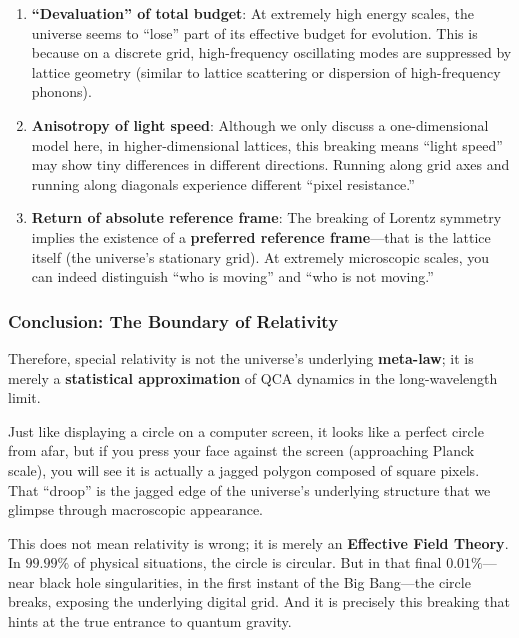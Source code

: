 \begin{enumerate}
\item \textbf{``Devaluation'' of total budget}: At extremely high energy scales, the universe seems to ``lose'' part of its effective budget for evolution. This is because on a discrete grid, high-frequency oscillating modes are suppressed by lattice geometry (similar to lattice scattering or dispersion of high-frequency phonons).

\item \textbf{Anisotropy of light speed}: Although we only discuss a one-dimensional model here, in higher-dimensional lattices, this breaking means ``light speed'' may show tiny differences in different directions. Running along grid axes and running along diagonals experience different ``pixel resistance.''

\item \textbf{Return of absolute reference frame}: The breaking of Lorentz symmetry implies the existence of a \textbf{preferred reference frame}---that is the lattice itself (the universe's stationary grid). At extremely microscopic scales, you can indeed distinguish ``who is moving'' and ``who is not moving.''
\end{enumerate}

\subsubsection{Conclusion: The Boundary of Relativity}

Therefore, special relativity is not the universe's underlying \textbf{meta-law}; it is merely a \textbf{statistical approximation} of QCA dynamics in the long-wavelength limit.

Just like displaying a circle on a computer screen, it looks like a perfect circle from afar, but if you press your face against the screen (approaching Planck scale), you will see it is actually a jagged polygon composed of square pixels. That ``droop'' is the jagged edge of the universe's underlying structure that we glimpse through macroscopic appearance.

This does not mean relativity is wrong; it is merely an \textbf{Effective Field Theory}. In $99.99\%$ of physical situations, the circle is circular. But in that final $0.01\%$---near black hole singularities, in the first instant of the Big Bang---the circle breaks, exposing the underlying digital grid. And it is precisely this breaking that hints at the true entrance to quantum gravity.

